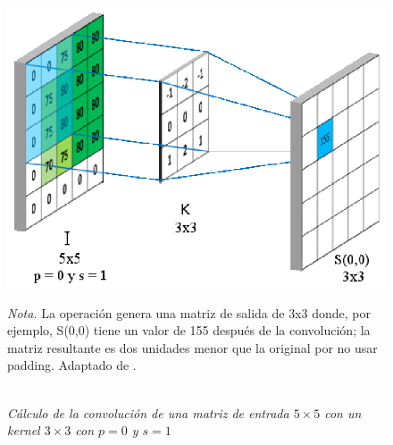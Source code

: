                     \begin{figure}[H] 
                        \caption{\doublespacing \\ \textit{Cálculo de la convolución de una matriz de entrada \( 5 \times 5 \) con un kernel \( 3 \times 3 \) con \( p = 0 \) y \( s = 1 \)}} 
                        \centering
                        \includegraphics[width=1\linewidth]{2_CAPITULO0/IMG/padding1.png}
                        \begin{justify}
                            \textit{Nota.} La operación genera una matriz de salida de 3x3 donde, por ejemplo, S(0,0) tiene un valor de 155 después de la convolución; la matriz resultante es dos unidades menor que la original por no usar padding. Adaptado de \textcite{Goodfellow2016}.
                        \end{justify}                    
                        \label{padding1}
                    \end{figure}
                    
